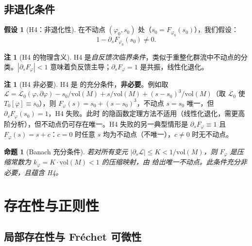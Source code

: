 \documentclass[12pt,a4paper]{article}
\newtheorem{proposition}[theorem]{命题}
\theoremstyle{definition}
\newtheorem{assumption}[theorem]{假设}
\newtheorem{remark}[theorem]{注}
\newcommand{\mL}{\mathcal{L}}
\newcommand{\vol}{\mathrm{vol}}
\begin{document}
\subsection{非退化条件}

\begin{assumption}[H4：非退化性]
\label{ass:h4}
在不动点 $(\varphi_0, s_0)$ 处（$s_0 = F_{\varphi_0}(s_0)$），我们假设：
\[ 1 - \partial_s F_{\varphi_0}(s_0) \neq 0. \tag{H4} \]
\end{assumption}

\begin{remark}[H4 的物理含义]
H4 是\emph{自反馈次临界条件}，类似于重整化群流中不动点的分类。$|\partial_s F_\varphi| < 1$ 意味着负反馈主导；$\partial_s F_\varphi = 1$ 是共振，线性化退化。
\end{remark}

\begin{remark}[H4 非必要]
\label{rem:h4-not-necessary}
H4 是  的充分条件，\textbf{非必要}。例如取 $\mL = \mL_0(\varphi, \partial\varphi) - s_0/\vol(M) + s/\vol(M) + (s - s_0)^3/\vol(M)$（取 $\mL_0$ 使 $T_0[\varphi] \equiv s_0$），则 $F_\varphi(s) = s_0 + (s - s_0)^3$，不动点 $s = s_0$ 唯一，但 $\partial_s F_\varphi(s_0) = 1$，H4 失败。此时  的隐函数定理方法不适用（线性化退化，需更高阶分析），但不动点仍可存在唯一。H4 失败的另一典型情形是 $\partial_s F_\varphi \equiv 1$ 且 $F_\varphi(s) = s + c$：$c = 0$ 时任意 $s$ 均为不动点（不唯一），$c \neq 0$ 时无不动点。
\end{remark}

\begin{proposition}[Banach 充分条件]
\label{prop:banach-suff}
若对所有变元 $|\partial_s \mL| \leq K < 1/\vol(M)$，则 $F_\varphi$ 是压缩常数为 $k_\varphi = K \cdot \vol(M) < 1$ 的压缩映射，由 给出唯一不动点。此条件充分非必要，且蕴含 H4。
\end{proposition}

\section{存在性与正则性}
\label{sec:existence}

\subsection{局部存在性与 Fr\'echet 可微性}
\end{document}
